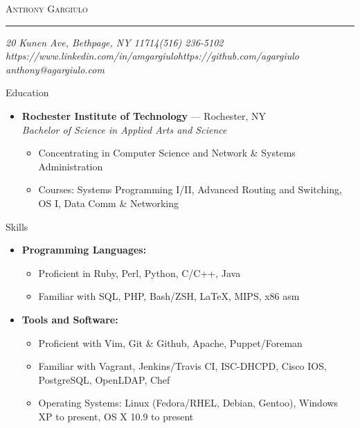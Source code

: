 \documentclass[10pt,oneside]{article}
\makeatletter
\newcommand{\name}{Anthony Gargiulo}
\newcommand{\addr}{20 Kunen Ave, Bethpage, NY 11714}
\newcommand{\mobilePhone}{(516) 236-5102}
\newcommand{\email}{anthony@agargiulo.com}
\newcommand{\github}{https://github.com/agargiulo}
\newcommand{\linkedin}{https://www.linkedin.com/in/amgargiulo}
\newcommand{\bigname}[1]{
	\begin{center}\fontfamily{bch}\selectfont\Huge\scshape#1\end{center}
}
\newenvironment{ressection}[1]{
	\vspace{3pt}
	{\fontfamily{bch}\selectfont\Large#1}
	\begin{itemize}
	\vspace{2pt}
}{
	\end{itemize}
}
\newcommand{\resitem}[1]{
	\vspace{-2pt}
	\item \begin{flushleft} #1 \end{flushleft}
}
\newcommand{\ressubitem}[1]{
	\vspace{-1pt}
	\item \begin{flushleft} #1 \end{flushleft}
}
\newcommand{\resbigitem}[3]{
	\vspace{-3pt}
	\item
	\textbf{#1} --- #2 \\
	\textit{#3}
}
\newenvironment{ressubsec}[3]{
	\resbigitem{#1}{#2}{#3}
	\vspace{-1pt}
	\begin{itemize}
}{
	\end{itemize}
}
\newenvironment{reslist}[1]{
	\resitem{\textbf{#1}}
	\vspace{-3pt}
	\begin{itemize}
}{
	\end{itemize}
}
\makeatother
\begin{document}
 \selectfont

\bigname{\name}

\vspace{-4pt} \rule{\textwidth}{1pt}

\vspace{-1pt} {\normalsize\itshape \addr \hfill \mobilePhone \\ \linkedin \hfill \github \\ \email}

\vspace{15 pt}





\begin{ressection}{Education}

	\begin{ressubsec}{Rochester Institute of Technology}{Rochester, NY}{Bachelor of Science in Applied Arts and Science}
		\ressubitem{Concentrating in Computer Science and Network \& Systems Administration}
		\ressubitem{Courses: Systems Programming I/II, Advanced Routing and Switching, OS I, Data Comm \& Networking}
	\end{ressubsec}

\end{ressection}


\begin{ressection}{Skills}


	\begin{reslist}{Programming Languages:}
		\ressubitem{Proficient in Ruby, Perl, Python, C/C++, Java}
		\ressubitem{Familiar with SQL, PHP, Bash/ZSH, \LaTeX, MIPS, x86 asm}
	\end{reslist}

	\begin{reslist}{Tools and Software:}
		\ressubitem{Proficient with Vim, Git \& Github, Apache, Puppet/Foreman}
		\ressubitem{Familiar with Vagrant, Jenkins/Travis CI, ISC-DHCPD, Cisco IOS, PostgreSQL, OpenLDAP, Chef}
		\ressubitem{Operating Systems: Linux (Fedora/RHEL, Debian, Gentoo), Windows XP to present, OS X 10.9 to present}
	\end{reslist}

\end{ressection}
\end{document}
